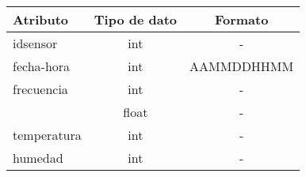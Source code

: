 \begin{tabular}{lcc}
	\toprule
	\textbf{Atributo} & \textbf{Tipo de dato} & \textbf{Formato} \\
	\midrule
	idsensor    & int   & - \\
	fecha-hora  & int   & AAMMDDHHMM \\
	frecuencia  & int   & - \\
	\MPF        & float & - \\
	temperatura & int   & - \\
	humedad     & int   & - \\
	\bottomrule
\end{tabular}